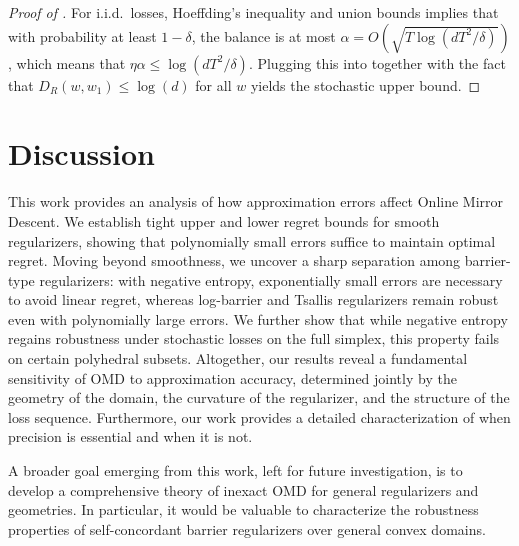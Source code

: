 \documentclass[10pt]{article}
\theoremstyle{definition}
\theoremstyle{remark}
\newcommand{\roundy}[1]{ {\left( #1 \right)}}
\begin{document}
\begin{proof}[Proof of ] 
For i.i.d.~losses, Hoeffding's inequality and union bounds implies that with probability at least $1-\delta$, the balance is at most $\alpha =O(\sqrt{T\log(dT^2/\delta)})$, which means that 
$\eta\alpha \le \log\roundy{dT^2/\delta}$. 
Plugging this into  together with the fact that $D_R(w,w_1)\le \log(d)$ for all $w$ yields the stochastic upper bound.
\end{proof}

\section{Discussion}
This work provides an analysis
of how approximation errors affect Online Mirror Descent. We establish tight upper and lower regret bounds for smooth regularizers, showing that polynomially small errors suffice to maintain optimal regret. Moving beyond smoothness, we uncover a sharp separation among barrier-type regularizers: with negative entropy, exponentially small errors are necessary to avoid linear regret, whereas log-barrier and Tsallis regularizers remain robust even with polynomially large errors. We further show that while negative entropy regains robustness under stochastic losses on the full simplex, this property fails on certain polyhedral subsets. Altogether, our results reveal a fundamental sensitivity of OMD to approximation accuracy, determined jointly by the geometry of the domain, the curvature of the regularizer, and the structure of the loss sequence. Furthermore, our work provides a detailed characterization of when precision is essential and when it is not. 

A broader goal emerging from this work, left for future investigation, is to develop a comprehensive theory of inexact OMD for general regularizers and geometries. In particular, it would be valuable to characterize the robustness properties of self-concordant barrier regularizers over general convex domains.
\end{document}

